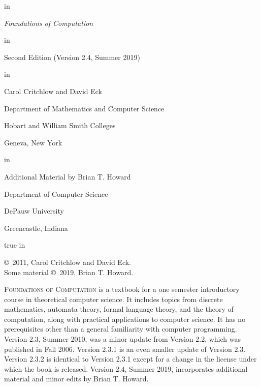 \documentclass{book}
\theoremstyle{definition}
\newcommand*{\largesize}[1]{{\Large#1}}
\newcommand*{\startchapter}[1]{\textsc{\largesize #1}}  %
\newcommand{\0}{\ensuremath{\mathtt{0}}}
\newcommand{\1}{\ensuremath{\mathtt{1}}}
\begin{document}
\frontmatter

\begin{titlepage}

 in 
\centerline{\Huge \textit{Foundations of Computation}}
 in
\centerline{Second Edition (Version 2.4, Summer 2019)}
 in
\centerline{\Large Carol Critchlow and David Eck}
\medskip
\centerline{Department of Mathematics and Computer Science}
\smallskip
\centerline{Hobart and William Smith Colleges}
\smallskip
\centerline{Geneva, New York}
 in
\centerline{\Large Additional Material by Brian T. Howard}
\medskip
\centerline{Department of Computer Science}
\smallskip
\centerline{DePauw University}
\smallskip
\centerline{Greencastle, Indiana}



\newpage
{} true in


\noindent \copyright\ 2011, Carol Critchlow and David Eck.\\
Some material \copyright\ 2019, Brian T. Howard.
\bigskip

\noindent \startchapter{Foundations of Computation} is a textbook for a one semester introductory course
in theoretical computer science.  It includes topics from discrete mathematics,
automata theory, formal language theory, and the theory of computation, along with
practical applications to computer science. It has no prerequisites other than a
general familiarity with computer programming.  Version 2.3, Summer 2010, was a minor 
update from Version 2.2, which was published in Fall 2006.  Version 2.3.1 is an even
smaller update of Version 2.3.  Version 2.3.2 is identical to Version 2.3.1 except for
a change in the license under which the book is released. Version 2.4, Summer 2019,
incorporates additional material and minor edits by Brian T. Howard.

\bigskip



\doclicenseThis{}







\end{titlepage}

\tableofcontents

%
%


\mainmatter









\printindex
\end{document}
